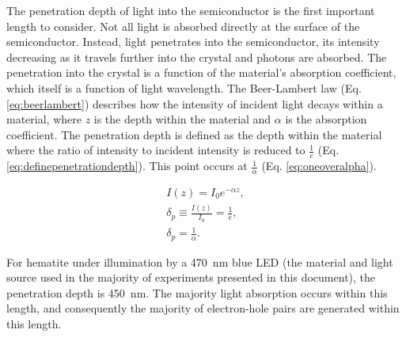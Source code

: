 The penetration depth of light into the semiconductor is the first important length to
consider. Not all light is absorbed directly at the surface of the semiconductor. Instead,
light penetrates into the semiconductor, its intensity decreasing as it travels further
into the crystal and photons are absorbed. The penetration into the crystal is a function
of the material's absorption coefficient, which itself is a function of light wavelength.
The Beer-Lambert law (Eq. \ref{eq:beerlambert}) describes how the intensity of incident
light decays within a material, where $z$ is the depth within the material and $\alpha$ is
the absorption coefficient. The penetration depth is defined as the depth within the
material where the ratio of intensity to incident intensity is reduced to  $\frac{1}{e}$
(Eq. \ref{eq:definepenetrationdepth}). This point occurs at $\frac{1}{\alpha}$ (Eq.
\ref{eq:oneoveralpha}).

\begin{gather}
	\label{eq:beerlambert}
	I(z)=I_{0}e^{-\alpha z},\\
	\label{eq:definepenetrationdepth}
	\delta_{p} \equiv \frac{I(z)}{I_{0}}=\frac{1}{e},\\
	\label{eq:oneoveralpha}
	\delta_{p} = \frac{1}{\alpha}.
\end{gather}

For hematite under illumination by a \SI{470}{\nano\meter} blue LED (the material and
light source used in the majority of experiments presented in this document), the
penetration depth is \texttildelow\SI{450}{\nano\meter}.\cite{Marusak:1980gc} The majority
light absorption occurs within this length, and consequently the majority of electron-hole
pairs are generated within this length.

